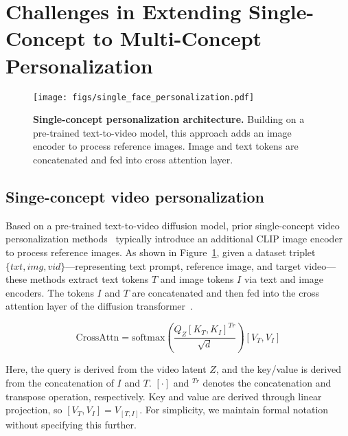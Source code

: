 \section{Challenges in Extending Single-Concept to Multi-Concept Personalization}


\begin{figure}[t]
    \begin{center}
    \texttt{[image: figs/single\_face\_personalization.pdf]}
    \end{center}
    \vspace{-1.5em}
        \caption{\textbf{Single-concept personalization architecture.} Building on a pre-trained text-to-video model, this approach adds an image encoder to process reference images. Image and text tokens are concatenated and fed into cross attention layer.}
        \vspace{-1em}
    \label{fig:single_concept_arch}
\end{figure}



\subsection{Singe-concept video personalization}

Based on a pre-trained text-to-video diffusion model, prior single-concept video personalization methods~\cite{he2024id, wu2024customcrafter, jiang2024videobooth, moviegen} typically introduce an additional CLIP image encoder~\cite{radford2021learning,xu2023demystifying} to process reference images. 
As shown in Figure~\ref{fig:single_concept_arch}, given a dataset triplet $\{txt, img, vid\}$—representing text prompt, reference image, and target video—these methods extract text tokens $T$ and image tokens $I$ via text and image encoders. 
The tokens $I$ and $T$ are concatenated and then fed into the cross attention layer of the diffusion transformer~\cite{peebles2023scalable}.

\vspace{-1em}
\begin{equation}
\text{CrossAttn} = \text{softmax}\left(\frac{Q_Z\left[ K_T, K_I \right]^{Tr}}{\sqrt{d}}\right) \left[V_T, V_I \right]
\label{eq:cross_attention}
\end{equation}

Here, the query is derived from the video latent $Z$, and the key/value is derived from the concatenation of $I$ and $T$. 
$\left[ \cdot \right]$ and $^{Tr}$ denotes the concatenation and transpose operation, respectively. 
Key and value are derived through linear projection, so $\left[V_T, V_I \right] = V_{\left[T,I\right]}$. For simplicity, we maintain formal notation without specifying this further.


